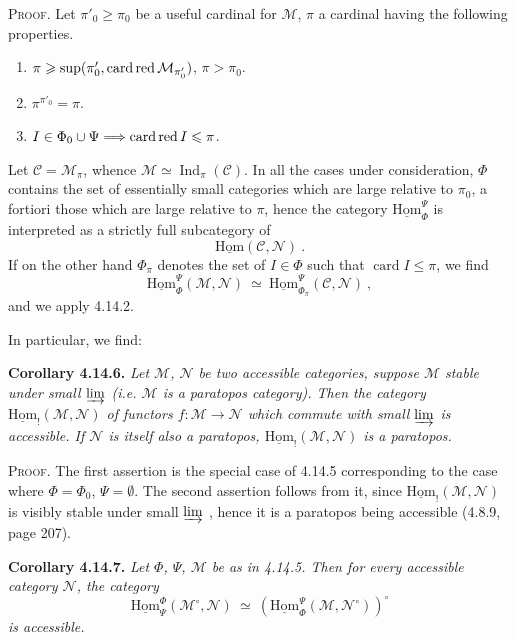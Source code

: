 \documentclass[11pt]{article}
\newcommand{\printedpage}[1]{\marginpar{\footnotesize p.~#1}}
\newcommand{\msp}[1]{\marginpar{\footnotesize [#1]}}
\newcommand{\uHom}{\underline{\mathrm{Hom}}}
\newcommand{\Ind}{\operatorname{Ind}}
\newcommand{\cardred}{\mathop{\textup{card\,red}}}
\newcommand{\card}{\operatorname{card}}
\begin{document}
\msp{page 376}

\noindent\textsc{Proof}. Let $\pi'_0\geqslant\pi_0$ be a useful cardinal for $\mathcal{M}$, $\pi$ a cardinal having the following properties.
\begin{enumerate}[leftmargin=2.5em]
\item[a)] $\pi\geqslant\sup(\pi'_0,\cardred\mathcal{M}_{\pi'_0})$, $\pi>\pi_0$.
\item[b)] $\pi^{\pi'_0}=\pi$.
\item[c)] $I\in\Phi_0\cup\Psi\Longrightarrow\cardred I\leqslant\pi$.
\end{enumerate}
\noindent Let $\mathcal{C}=\mathcal{M}_\pi$, whence $\mathcal{M}\simeq\Ind_\pi(\mathcal{C})$. In all the cases under consideration, $\Phi$ contains the set of essentially small categories which are large relative to $\pi_0$, a fortiori those which are large relative to $\pi$, hence the category $\uHom^{\Psi}_{\Phi}$ is interpreted as a strictly full subcategory of
\[
\uHom(\mathcal{C},\mathcal{N})\ .
\]
If on the other hand $\Phi_\pi$ denotes the set of $I\in\Phi$ such that $\card I\leqslant\pi$, we find
\[
\uHom^{\Psi}_{\Phi}(\mathcal{M},\mathcal{N})\ \simeq\ \uHom^{\Psi}_{\Phi_\pi}(\mathcal{C},\mathcal{N})\ ,
\]
and we apply 4.14.2.

\printedpage{143}
\msp{page 377}

In particular, we find:

\noindent\textbf{Corollary 4.14.6.} {\itshape Let $\mathcal{M}$, $\mathcal{N}$ be two accessible categories, suppose $\mathcal{M}$ stable under small $\varinjlim$ (i.e. $\mathcal{M}$ is a paratopos category). Then the category $\uHom_{!}(\mathcal{M},\mathcal{N})$ of functors $f:\mathcal{M}\longrightarrow\mathcal{N}$ which commute with small $\varinjlim$ is accessible. If $\mathcal{N}$ is itself also a paratopos, $\uHom_{!}(\mathcal{M},\mathcal{N})$ is a paratopos.}

\noindent\textsc{Proof}. The first assertion is the special case of 4.14.5 corresponding to the case where $\Phi=\Phi_0$, $\Psi=\emptyset$. The second assertion follows from it, since $\uHom_{!}(\mathcal{M},\mathcal{N})$ is visibly stable under small $\varinjlim$ , hence it is a paratopos being accessible (4.8.9, page 207).

\noindent\textbf{Corollary 4.14.7.} {\itshape Let $\Phi$, $\Psi$, $\mathcal{M}$ be as in 4.14.5. Then for every accessible category $\mathcal{N}$, the category
\msp{page 378}
\[
\uHom^{\Phi}_{\Psi}(\mathcal{M}^{\circ},\mathcal{N})\ \simeq\ (\uHom^{\Psi}_{\Phi}(\mathcal{M},\mathcal{N}^{\circ}))^{\circ}
\]
is accessible.}
\end{document}
